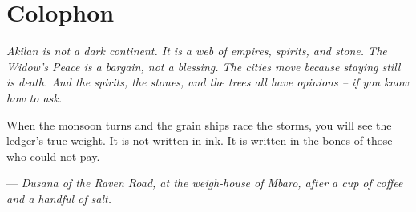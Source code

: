 \documentclass[11pt]{book}
\newenvironment{lorebox}{\begin{tcolorbox}[colback=black!2!white,colframe=black!40!white,sharp corners,breakable]\small\itshape}{\end{tcolorbox}}
\begin{document}
\chapter{Colophon}

\vspace{2\baselineskip}
\begin{lorebox}
Akilan is not a dark continent. It is a web of empires, spirits, and stone. The Widow's Peace is a bargain, not a blessing. The cities move because staying still is death. And the spirits, the stones, and the trees all have opinions -- if you know how to ask.

When the monsoon turns and the grain ships race the storms, you will see the ledger's true weight. It is not written in ink. It is written in the bones of those who could not pay.

--- \textit{Dusana of the Raven Road, at the weigh‑house of Mbaro, after a cup of coffee and a handful of salt.}
\end{lorebox}
\end{document}
